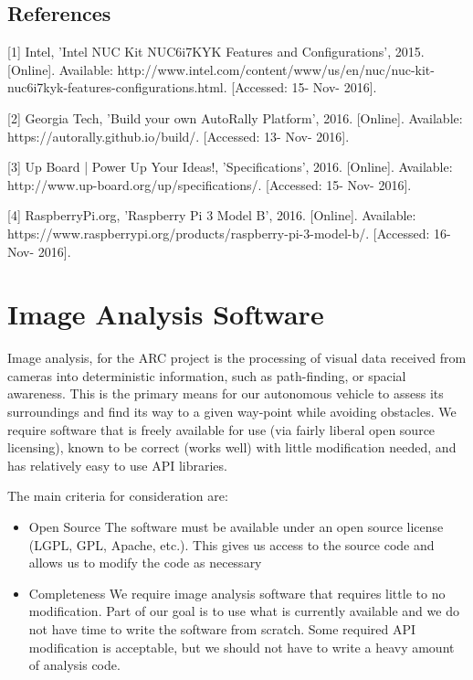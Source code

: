\documentclass[compsoc,draftclsnofoot,onecolumn,10pt]{IEEEtran}
\begin{document}
\subsection{References}
[1] Intel, 'Intel NUC Kit NUC6i7KYK Features and Configurations',  2015. [Online]. Available: http://www.intel.com/content/www/us/en/nuc/nuc-kit-nuc6i7kyk-features-configurations.html. [Accessed: 15- Nov- 2016].

[2] Georgia Tech, 'Build your own AutoRally Platform',  2016. [Online]. Available: https://autorally.github.io/build/. [Accessed: 13- Nov- 2016].

[3] Up Board | Power Up Your Ideas!, 'Specifications',  2016. [Online]. Available: http://www.up-board.org/up/specifications/. [Accessed: 15- Nov- 2016].

[4] RaspberryPi.org, 'Raspberry Pi 3 Model B',  2016. [Online]. Available: https://www.raspberrypi.org/products/raspberry-pi-3-model-b/. [Accessed: 16- Nov- 2016].


\newpage

\section{Image Analysis Software}
Image analysis, for the ARC project is the processing of visual data received
from cameras into deterministic information, such as path-finding, or spacial
awareness. This is the primary means for our autonomous vehicle to assess its
surroundings and find its way to a given way-point while avoiding obstacles. We
require software that is freely available for use (via fairly liberal open
source licensing), known to be correct (works well) with little modification
needed, and has relatively easy to use API libraries.

The main criteria for consideration are:
\begin{itemize}
	
	\item Open Source
		\subitem 
		 The software must be available under an open source license
		 (LGPL, GPL, Apache, etc.). This gives us access to the source code and allows
		 us to modify the code as necessary
	\item Completeness
		\subitem 
		 We require image analysis software that requires little to
		 no modification. Part of our goal is to use what is currently available and
		 we do not have time to write the software from scratch. Some required API 
		 modification is acceptable, but we should not have to write a heavy amount
		 of analysis code.	
	  
\end{itemize}
\end{document}
